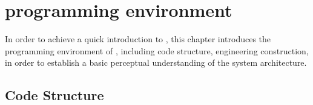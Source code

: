 \begin{savequote}[45mm]
\end{savequote}

\chapter{programming environment} 
\label{ch:prog-env}

\begin{content}

In order to achieve a quick introduction to \tf{}, this chapter introduces the programming environment of \tf{}, including code structure, engineering construction, in order to establish a basic perceptual understanding of the \tf{} system architecture.

\end{content}

\section{Code Structure}

